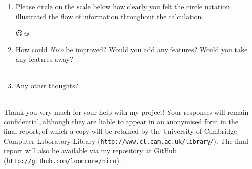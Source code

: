 \documentclass[14pt]{article}
\begin{document}
\begin{enumerate}
\item Please circle on the scale below how clearly you felt the circle notation
illustrated the flow of information throughout the calculation.

\begin{center}
{\Huge \vspace{-0.5cm}☹\hspace{0.25cm}{\bf ·}\hspace{0.25cm}{\bf ·}\hspace{0.25cm}{\bf ·}\hspace{0.25cm}☺\\}
\end{center}

\item How could \emph{Nico} be improved?  Would you add any features?  Would you
take any features away?\\

\fbox{
\begin{minipage}{17cm}
\hfill\vspace{3cm}
\end{minipage}
}\\

\item Any other thoughts?\\

\fbox{
\begin{minipage}{17cm}
\hfill\vspace{3cm}
\end{minipage}
}\\

\end{enumerate}

Thank you very much for your help with my project!  Your responses will remain
confidential, although they are liable to appear in an anonymised form
in the final report, of which a copy will be retained by the University of
Cambridge Computer Laboratory Library
(\verb¬http://www.cl.cam.ac.uk/library/¬).  The final report will also be
available via my repository at GitHub
(\verb¬http://github.com/loomcore/nico¬).
\end{document}
